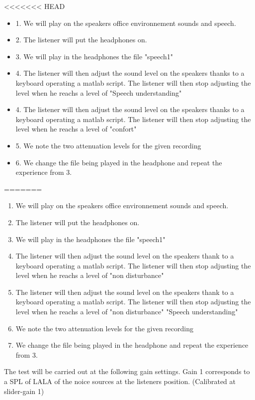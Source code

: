 \documentclass[12pt,a4paper]{article}
\begin{document}
<<<<<<< HEAD
\begin{itemize}
\item 1. We will play on the speakers office environnement sounds and speech. 
\item 2. The listener will put the headphones on.
\item 3. We will play in the headphones the file "speech1"
\item 4. The listener will then adjust the sound level on the speakers thanks to a keyboard operating a matlab script. The listener will then stop adjusting the level when he reachs a level of "Speech understanding"
\item 4. The listener will then adjust the sound level on the speakers thanks to a keyboard operating a matlab script. The listener will then stop adjusting the level when he reachs a level of "confort"
\item 5. We note the two attenuation levels for the given recording
\item 6. We change the file being played in the headphone and repeat the experience from 3.
\end{itemize}
=======
\begin{enumerate}


\item We will play on the speakers office environnement sounds and speech. 
\item The listener will put the headphones on.
\item We will play in the headphones the file "speech1"
\item The listener will then adjust the sound level on the speakers thank to a keyboard operating a matlab script. The listener will then stop adjusting the level when he reachs a level of "non disturbance"
\item The listener will then adjust the sound level on the speakers thank to a keyboard operating a matlab script. The listener will then stop adjusting the level when he reachs a level of "non disturbance" "Speech understanding"
\item We note the two attenuation levels for the given recording
\item We change the file being played in the headphone and repeat the experience from 3.
\end{enumerate}
\noindent
The test will be carried out at the following gain settings. Gain 1 corresponds to a SPL of LALA of the noice sources at the listeners position. (Calibrated at slider-gain 1) \\\\
\end{document}
